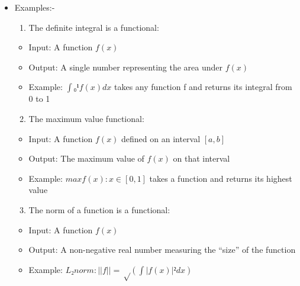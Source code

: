 \documentclass[
  ignorenonframetext,
]{beamer}
\providecommand{\tightlist}{%
  \setlength{\itemsep}{0pt}\setlength{\parskip}{0pt}}\usepackage{longtable,booktabs,array}
\begin{document}
\begin{frame}{}
\label{section-3}
\begin{itemize}
\tightlist
\item
  Examples:-

  \begin{enumerate}
  \tightlist
  \item
    The definite integral is a functional:
  \end{enumerate}

  \begin{itemize}
  \tightlist
  \item
    Input: A function \(f(x)\)
  \item
    Output: A single number representing the area under \(f(x)\)
  \item
    Example: \(∫₀¹ f(x)dx\) takes any function f and returns its
    integral from 0 to 1
  \end{itemize}

  \begin{enumerate}
  \setcounter{enumi}{1}
  \tightlist
  \item
    The maximum value functional:
  \end{enumerate}

  \begin{itemize}
  \tightlist
  \item
    Input: A function \(f(x)\) defined on an interval \([a,b]\)
  \item
    Output: The maximum value of \(f(x)\) on that interval
  \item
    Example: \(max{f(x): x ∈ [0,1]}\) takes a function and returns its
    highest value
  \end{itemize}

  \begin{enumerate}
  \setcounter{enumi}{2}
  \tightlist
  \item
    The norm of a function is a functional:
  \end{enumerate}

  \begin{itemize}
  \tightlist
  \item
    Input: A function \(f(x)\)
  \item
    Output: A non-negative real number measuring the ``size'' of the
    function
  \item
    Example: \(L₂ norm: ||f|| = √(∫|f(x)|²dx)\)
  \end{itemize}
\end{itemize}
\end{frame}
\end{document}
